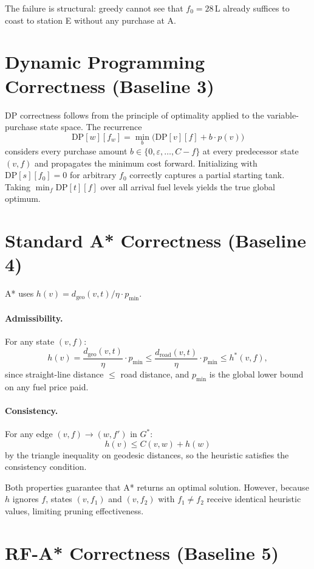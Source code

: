 The failure is structural: greedy cannot see that $f_0=28$\,L already suffices to coast to
station E without any purchase at A.

\section{Dynamic Programming Correctness (Baseline 3)}

DP correctness follows from the principle of optimality applied to the variable-purchase
state space.
The recurrence
\[
    \mathrm{DP}[w][f_w] = \min_{b}\!\bigl(\mathrm{DP}[v][f] + b \cdot p(v)\bigr)
\]
considers every purchase amount $b \in \{0,\varepsilon,\ldots,C-f\}$ at every predecessor
state $(v,f)$ and propagates the minimum cost forward.
Initializing with $\mathrm{DP}[s][f_0]=0$ for arbitrary $f_0$ correctly captures a partial
starting tank.
Taking $\min_{f}\mathrm{DP}[t][f]$ over all arrival fuel levels yields the true global
optimum.

\section{Standard A* Correctness (Baseline 4)}

A* uses $h(v) = d_{\mathrm{geo}}(v,t)/\eta \cdot p_{\min}$.

\paragraph{Admissibility.}
For any state $(v,f)$:
\[
    h(v) = \frac{d_{\mathrm{geo}}(v,t)}{\eta} \cdot p_{\min}
         \leq \frac{d_{\mathrm{road}}(v,t)}{\eta} \cdot p_{\min}
         \leq h^{*}(v,f),
\]
since straight-line distance $\leq$ road distance, and $p_{\min}$ is the global lower bound
on any fuel price paid.

\paragraph{Consistency.}
For any edge $(v,f) \to (w,f')$ in $G^{*}$:
\[
    h(v) \leq C(v,w) + h(w)
\]
by the triangle inequality on geodesic distances, so the heuristic satisfies the consistency
condition.

Both properties guarantee that A* returns an optimal solution.
However, because $h$ ignores $f$, states $(v,f_1)$ and $(v,f_2)$ with $f_1 \neq f_2$ receive
identical heuristic values, limiting pruning effectiveness.

\section{RF-A* Correctness (Baseline 5)}

